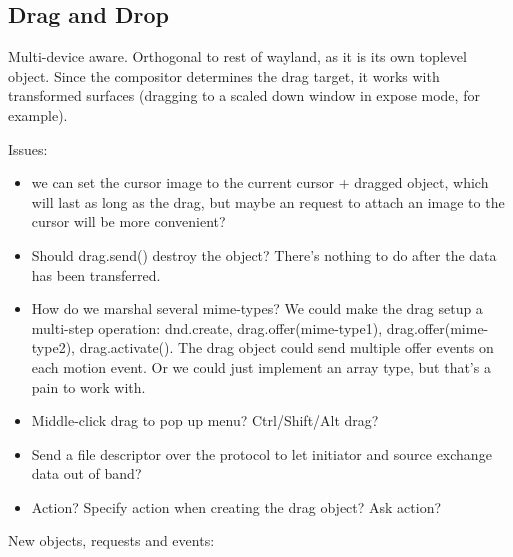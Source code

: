 \documentclass{article}
\begin{document}
\subsection{Drag and Drop}

Multi-device aware. Orthogonal to rest of wayland, as it is its own
toplevel object.  Since the compositor determines the drag target, it
works with transformed surfaces (dragging to a scaled down window in
expose mode, for example).

Issues: 

\begin{itemize}
\item we can set the cursor image to the current cursor + dragged
  object, which will last as long as the drag, but maybe an request to
  attach an image to the cursor will be more convenient?

\item Should drag.send() destroy the object?  There's nothing to do
  after the data has been transferred.

\item How do we marshal several mime-types?  We could make the drag
  setup a multi-step operation: dnd.create, drag.offer(mime-type1),
  drag.offer(mime-type2), drag.activate().  The drag object could send
  multiple offer events on each motion event.  Or we could just
  implement an array type, but that's a pain to work with.

\item Middle-click drag to pop up menu?  Ctrl/Shift/Alt drag?

\item Send a file descriptor over the protocol to let initiator and
  source exchange data out of band?

\item Action?  Specify action when creating the drag object? Ask
  action?
\end{itemize}

New objects, requests and events:
\end{document}
